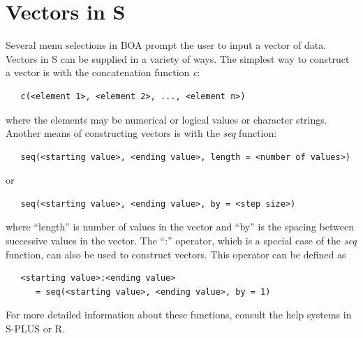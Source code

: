 \documentclass[12pt,letterpaper]{report}
\begin{document}
\section{Vectors in S}
\noindent
Several menu selections in BOA prompt the user to input a vector of data.
Vectors in S can be supplied in a variety of ways. The simplest way to construct
a vector is with the concatenation function {\it c}:
\vskip 9pt
\begin{tiny}
\begin{verbatim}
   c(<element 1>, <element 2>, ..., <element n>)
\end{verbatim}
\end{tiny}
where the elements may be numerical or logical values or character
strings. Another means of constructing vectors is with the {\it seq}
function:
\vskip 9pt
\begin{tiny}
\begin{verbatim}
   seq(<starting value>, <ending value>, length = <number of values>)
\end{verbatim}
\end{tiny}
or
\vskip 9pt
\begin{tiny}
\begin{verbatim}
   seq(<starting value>, <ending value>, by = <step size>)
\end{verbatim}
\end{tiny}
where ``length'' is number of values in the vector and ``by'' is the spacing
between successive values in the vector. The ``:'' operator, which is a special
case of the {\it seq} function, can also be used to construct vectors. This
operator can be defined as
\vskip 9pt
\begin{tiny}
\begin{verbatim}
   <starting value>:<ending value>
      = seq(<starting value>, <ending value>, by = 1)
\end{verbatim}
\end{tiny}
For more detailed information about these functions, consult the help systems in
S-PLUS or R.
\end{document}
